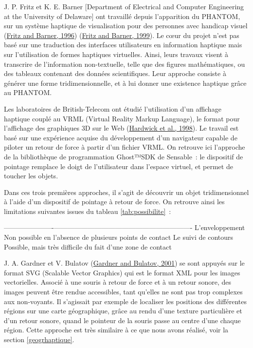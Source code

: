\documentclass[
]{book}
\begin{document}
J. P. Fritz et K. E. Barner {[}Department of Electrical and Computer
Engineering at the University of Delaware{]} ont travaillé depuis l'apparition
du PHANTOM, sur un système haptique de visualisation pour des personnes avec
handicap visuel (\protect\hyperlink{ref-fritz1996design}{Fritz and Barner, 1996}) (\protect\hyperlink{ref-fritz1999design}{Fritz and Barner, 1999}). Le cœur du
projet n'est pas basé sur une traduction des interfaces utilisateurs en
information haptique mais sur l'utilisation de formes haptiques virtuelles.
Ainsi, leurs travaux visent à transcrire de l'information non-textuelle,
telle que des figures mathématiques, ou des tableaux contenant des données
scientifiques. Leur approche consiste à générer une forme tridimensionnelle,
et à lui donner une existence haptique grâce au PHANTOM.

Les laboratoires de British-Telecom ont étudié l'utilisation d'un
affichage haptique couplé au VRML (Virtual Reality Markup Language), le
format pour l'affichage des graphiques 3D sur le Web (\protect\hyperlink{ref-hardwick1998tactile}{Hardwick et al., 1998}).
Le travail est basé sur une expérience acquise du développement d'un navigateur
capable de piloter un retour de force à partir d'un fichier VRML. On retrouve
ici l'approche de la bibliothèque de programmation Ghost™SDK de Sensable~: le
dispositif de pointage remplace le doigt de l'utilisateur dans l'espace
virtuel, et permet de toucher les objets.

Dans ces trois premières approches, il s'agit de découvrir un objet
tridimensionnel à l'aide d'un dispositif de pointage à retour de force. On
retrouve ainsi les limitations suivantes issues du
tableau \ref{tab:possibilite}~:

\textbar----------------------\textbar-------------------------------------------------------------\textbar{}
\textbar{} L'enveloppement \textbar{} Non possible en l'absence de plusieurs points de contact \textbar{}
\textbar{} Le suivi de contours \textbar{} Possible, mais très difficile du fait d'une zone de contact \textbar{}

J. A. Gardner et V. Bulatov (\protect\hyperlink{ref-gardner2001smart}{Gardner and Bulatov, 2001}) se sont appuyés sur le format
SVG (Scalable Vector Graphics) qui est le format XML pour les images
vectorielles. Associé à une souris à retour de force et à un retour sonore, des
images peuvent être rendue accessibles, tant qu'elles ne sont pas trop
complexes aux non-voyants. Il s'agissait par exemple de localiser les
positions des différentes régions
sur une carte géographique, grâce au rendu d'une texture particulière et d'un
retour sonore, quand le pointeur de la souris passe au centre d'une chaque
région. Cette approche est très similaire à ce que nous avons réalisé, voir
la section \ref{geogrhaptique}.
\end{document}
